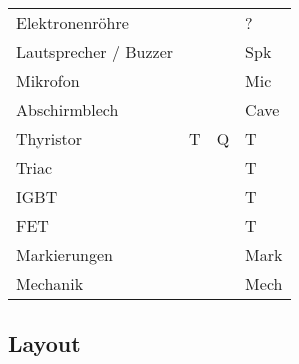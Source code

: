 \begin{table}[h!]
\begin{tabular}{llll}
  \rowcolor{white}  Elektronenröhre         &       &       & ? \\
  \rowcolor{lgray}  Lautsprecher / Buzzer   &       &       & Spk \\
  \rowcolor{white}  Mikrofon                &       &       & Mic \\
  \rowcolor{lgray}  Abschirmblech           &       &       & Cave \\
  \rowcolor{white}  Thyristor               & T     & Q     & T \\
  \rowcolor{lgray}  Triac                   &       &       & T \\
  \rowcolor{white}  IGBT                    &       &       & T \\
  \rowcolor{lgray}  FET                     &       &       & T \\
  \rowcolor{white}  Markierungen            &       &       & Mark \\
  \rowcolor{lgray}  Mechanik                &       &       & Mech
  \end{tabular}
\end{table}

\subsection{Layout}